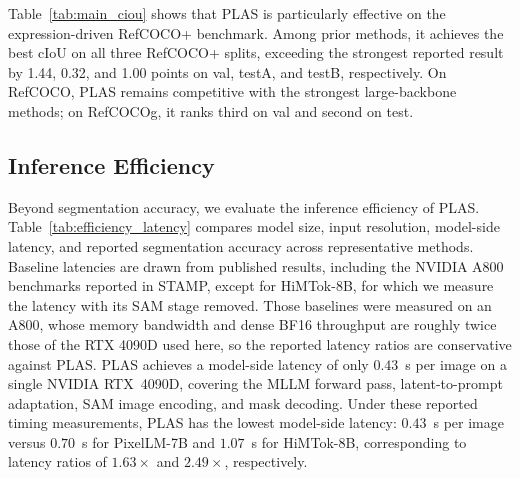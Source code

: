 Table~\ref{tab:main_ciou} shows that PLAS is particularly effective on the expression-driven RefCOCO+ benchmark. Among prior methods, it achieves the best cIoU on all three RefCOCO+ splits, exceeding the strongest reported result by 1.44, 0.32, and 1.00 points on val, testA, and testB, respectively. On RefCOCO, PLAS remains competitive with the strongest large-backbone methods; on RefCOCOg, it ranks third on val and second on test.


\subsection{Inference Efficiency}
\label{sec:efficiency}

Beyond segmentation accuracy, we evaluate the inference efficiency of PLAS. Table~\ref{tab:efficiency_latency} compares model size, input resolution, model-side latency, and reported segmentation accuracy across representative methods. Baseline latencies are drawn from published results, including the NVIDIA A800 benchmarks reported in STAMP, except for HiMTok-8B, for which we measure the latency with its SAM stage removed.  Those baselines were measured on an A800, whose memory bandwidth and dense BF16 throughput are roughly twice those of the RTX 4090D used here, so the reported latency ratios are conservative against PLAS. PLAS achieves a model-side latency of only $0.43$~s per image on a single NVIDIA RTX~4090D, covering the MLLM forward pass, latent-to-prompt adaptation, SAM image encoding, and mask decoding. Under these reported timing measurements, PLAS has the lowest model-side latency: $0.43$~s per image versus $0.70$~s for PixelLM-7B and $1.07$~s for HiMTok-8B, corresponding to latency ratios of $1.63\times$ and $2.49\times$, respectively. 
